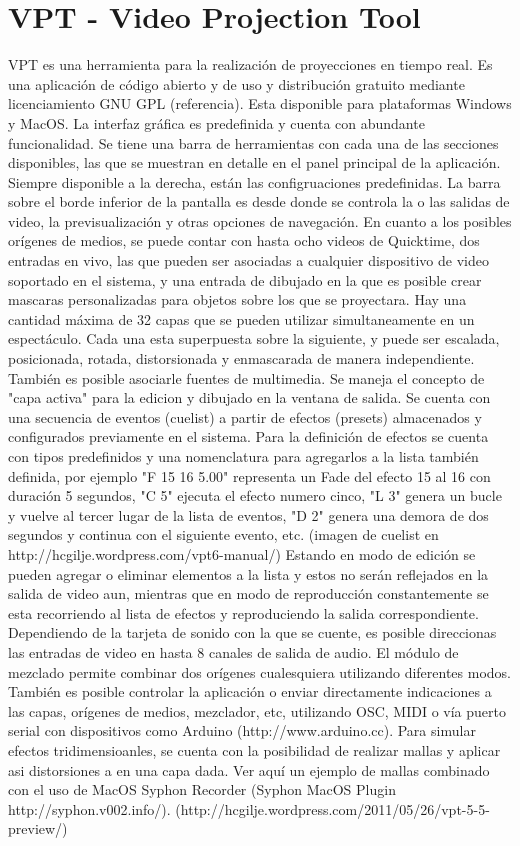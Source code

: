 \section{VPT - Video Projection Tool}
VPT es una herramienta para la realización de proyecciones en tiempo real. Es una aplicación de código abierto y de uso y distribución gratuito mediante licenciamiento GNU GPL (referencia). Esta disponible para plataformas Windows y MacOS.
La interfaz gráfica es predefinida y cuenta con abundante funcionalidad. Se tiene una barra de herramientas con cada una de las secciones disponibles, las que se muestran en detalle en el panel principal de la aplicación. Siempre disponible a la derecha, están las configruaciones predefinidas. La barra sobre el borde inferior de la pantalla es desde donde se controla la o las salidas de video, la previsualización y otras opciones de navegación.
En cuanto a los posibles orígenes de medios, se puede contar con hasta ocho videos de Quicktime, dos entradas en vivo, las que pueden ser asociadas a cualquier dispositivo de video soportado en el sistema, y una entrada de dibujado en la que es posible crear mascaras personalizadas para objetos sobre los que se proyectara.
Hay una cantidad máxima de 32 capas que se pueden utilizar simultaneamente en un espectáculo. Cada una esta superpuesta sobre la siguiente, y puede ser escalada, posicionada, rotada, distorsionada y enmascarada de manera independiente. También es posible asociarle fuentes de multimedia. Se maneja el concepto de "capa activa" para la edicion y dibujado en la ventana de salida.
Se cuenta con una secuencia de eventos (cuelist) a partir de efectos (presets) almacenados y configurados previamente en el sistema. Para la definición de efectos se cuenta con tipos predefinidos y una nomenclatura para agregarlos a la lista también definida, por ejemplo "F 15 16 5.00" representa un Fade del efecto 15 al 16 con duración 5 segundos, "C 5" ejecuta el efecto numero cinco, "L 3" genera un bucle y vuelve al tercer lugar de la lista de eventos, "D 2" genera una demora de dos segundos y continua con el siguiente evento, etc.
(imagen de cuelist en http://hcgilje.wordpress.com/vpt6-manual/)
Estando en modo de edición se pueden agregar o eliminar elementos a la lista y estos no serán reflejados en la salida de video aun, mientras que en modo de reproducción constantemente se esta recorriendo al lista de efectos y reproduciendo la salida correspondiente.
Dependiendo de la tarjeta de sonido con la que se cuente, es posible direccionas las entradas de video en hasta 8 canales de salida de audio. El módulo de mezclado permite combinar dos orígenes cualesquiera utilizando diferentes modos. También es posible controlar la aplicación o enviar directamente indicaciones a las capas, orígenes de medios, mezclador, etc, utilizando OSC, MIDI o vía puerto serial con dispositivos como Arduino (http://www.arduino.cc).
Para simular efectos tridimensioanles, se cuenta con la posibilidad de realizar mallas y aplicar asi distorsiones a en una capa dada. Ver aquí un ejemplo de mallas combinado con el uso de MacOS Syphon Recorder (Syphon MacOS Plugin http://syphon.v002.info/). (http://hcgilje.wordpress.com/2011/05/26/vpt-5-5-preview/)
